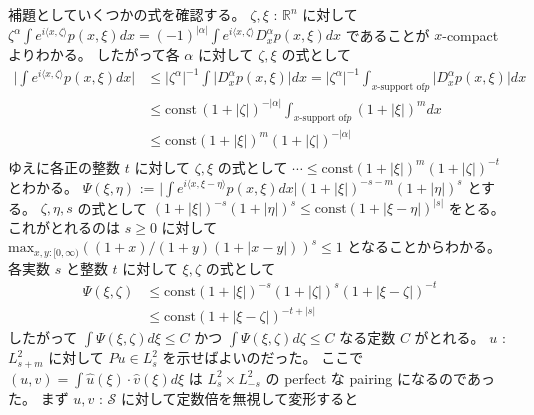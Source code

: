 \begin{Proof}
\itemprof
  補題としていくつかの式を確認する。
  \(\zeta , \xi\) : \(\mathbb{R}^n\) に対して \(\zeta^\alpha \int e^{i \langle x , \zeta \rangle} p(x , \xi) d x = (-1)^{\lvert \alpha \rvert} \int e^{i \langle x , \zeta \rangle} D^\alpha_x p(x , \xi) dx\) であることが \(x\)-compact よりわかる。
  したがって各 \(\alpha\) に対して \(\zeta,\xi\) の式として
  \begin{align*}
    \lvert \int e^{i \langle x , \zeta \rangle} p(x , \xi) d x \rvert
    &\leq \lvert \zeta^\alpha \rvert^{-1} \int  \lvert D^\alpha_x p(x , \xi) \rvert dx = \lvert \zeta^\alpha \rvert^{-1} \int_{x\text{-support of} p} \lvert D^\alpha_x p(x , \xi) \rvert dx \\
    &\leq \text{const} \, (1 + \lvert \zeta \rvert)^{- \lvert \alpha \rvert}  \int_{x\text{-support of} p} (1 + \lvert \xi \rvert)^m dx \\
    &\leq \text{const} (1 + \lvert \xi \rvert)^m (1 + \lvert \zeta \rvert)^{- \lvert \alpha \rvert} \\
  \end{align*}
  ゆえに各正の整数 \(t\) に対して \(\zeta , \xi\) の式として \(\cdots \leq \text{const} (1 + \lvert \xi \rvert)^m (1 + \lvert \zeta \rvert)^{-t}\) とわかる。
  \(\Psi(\xi,\eta)\) := \(\lvert \int e^{i \langle x , \xi - \eta \rangle} p(x , \xi) dx \rvert (1 + \lvert \xi \rvert)^{-s-m} (1 + \lvert \eta \rvert)^s\) とする。
  \(\zeta , \eta , s\) の式として \((1 + \lvert \xi \rvert)^{-s} (1 + \lvert \eta \rvert)^s \leq \text{const} (1 + \lvert \xi - \eta \rvert)^{\lvert s \rvert}\) をとる。
  これがとれるのは \(s \geq 0\) に対して \(\text{max}_{x,y : [0 , \infty)} ((1 + x) / (1 + y) (1 + \lvert x - y \rvert))^s \leq 1\) となることからわかる。
  各実数 \(s\) と整数 \(t\) に対して \(\xi , \zeta\) の式として
  \begin{align*}
    \Psi(\xi,\zeta)
    &\leq \text{const} (1 + \lvert \xi \rvert)^{-s} (1 + \lvert \zeta \rvert)^{s} (1 + \lvert \xi - \zeta \rvert)^{-t} \\
    &\leq \text{const} (1 + \lvert \xi - \zeta \rvert)^{-t + \lvert s \rvert}
  \end{align*}
  したがって \(\int \Psi(\xi,\zeta) d\xi \leq C\) かつ \(\int \Psi(\xi , \zeta) d\zeta \leq C\) なる定数 \(C\) がとれる。
\itemthen
  \(u\) : \(L^2_{s + m}\) に対して \(P u \in L^2_s\) を示せばよいのだった。
  ここで \((u,v) = \int \hat{u}(\xi) \cdot \hat{v}(\xi) d\xi\) は \(L^2_s \times L^2_{-s}\) の perfect な pairing になるのであった。
  まず \(u , v\) : \(\mathscr{S}\) に対して定数倍を無視して変形すると

\end{Proof}
